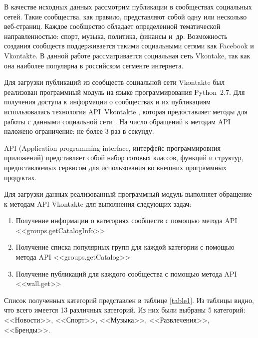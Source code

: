 \documentclass[a4paper]{report}
\begin{document}
	В качестве исходных данных рассмотрим публикации в сообществах социальных сетей. 
	Такие сообщества, как правило, представляют собой одну или несколько веб-страниц. 
	Каждое сообщество обладает определенной тематической направленностью: спорт, музыка, политика, финансы и~др.
	Возможность создания сообществ поддерживается такими социальными сетями как Facebook и Vkontakte. 
	В данной работе рассматривается социальная сеть Vkontake, так как она наиболее популярна в российском сегменте интернета.
			
	
	Для загрузки публикаций из сообществ социальной сети Vkontakte был реализован программный модуль на языке программирования Python~2.7. 
	Для получения доступа к информации о сообществах и их публикациям использовалась технология API~Vkontakte \cite{bib:vkapi}, которая предоставляет методы для работы с данными социальной сети \cite{bib:methods}. На число обращений к методам API наложено ограничение: не более 3 раз в секунду.
	
	API (Application programming interface, интерфейс программировния приложений) представляет собой набор готовых классов, функций и структур, предоставляемых сервисом для использования во внешних программных продуктах. 
	
	Для загрузки данных реализованный программный модуль выполняет обращение к методам API Vkontakte для выполнения следующих задач:
	
	\begin{enumerate}
	\item{Получение информации о категориях сообществ с помощью метода API <<groups.getCatalogInfo>>}
	\item{Получение списка популярных групп для каждой категории с помощью метода API <<groups.getCatalog>> }
	\item{Получение публикаций для каждого сообщества с помощью метода API <<wall.get>>}
	
	\end{enumerate}
	
	Список полученных категорий представлен в таблице \ref{table1}. Из таблицы видно, что всего имеется 13 различных категорий. Из них были выбраны 5 категорий: <<Новости>>, <<Спорт>>, <<Музыка>>, <<Развлечения>>, <<Бренды>>.
	
	
		
\end{document}
